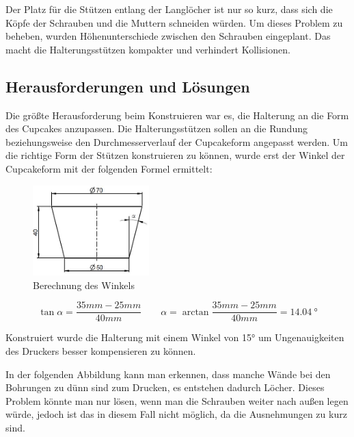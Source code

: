 	Der Platz für die Stützen entlang der Langlöcher ist nur so kurz, dass sich die Köpfe der Schrauben und die Muttern schneiden würden.
	Um dieses Problem zu beheben, wurden Höhenunterschiede zwischen den Schrauben eingeplant.
	Das macht die Halterungsstützen kompakter und verhindert Kollisionen.

			\newpage

	\subsection{Herausforderungen und Lösungen}

	Die größte Herausforderung beim Konstruieren war es, die Halterung an die Form des Cupcakes anzupassen.
	Die Halterungsstützen sollen an die Rundung beziehungsweise den Durchmesserverlauf der Cupcakeform angepasst werden.
	Um die richtige Form der Stützen konstruieren zu können, wurde erst der Winkel der Cupcakeform mit der  folgenden Formel ermittelt:

			\begin{figure}[H]
			\begin{centering}
			\includegraphics[width = 0.4\textwidth]{Bilder/berechnung_winkel}
			\par\end{centering}
			\caption{Berechnung des Winkels}
			\label{berechnung_winkel}
			\end{figure}

			\[
 				\tan \alpha = \frac{35mm-25mm}{40mm}  \qquad \alpha = \arctan \frac{35mm-25mm}{40mm} = \SI{14.04}{\degree}
 			\]

	Konstruiert wurde die Halterung mit einem Winkel von 15° um Ungenauigkeiten des Druckers besser kompensieren zu können.

	In der folgenden Abbildung kann man erkennen, dass manche Wände bei den Bohrungen zu dünn sind zum Drucken, es entstehen dadurch Löcher.
	Dieses Problem könnte man nur lösen, wenn man die Schrauben weiter nach außen legen würde, jedoch ist das in diesem Fall nicht möglich, da die Ausnehmungen zu kurz sind.


